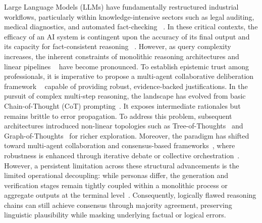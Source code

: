 \documentclass{article}
\begin{document}
Large Language Models (LLMs) have fundamentally restructured industrial workflows, particularly within knowledge-intensive sectors such as legal auditing, medical diagnostics, and automated fact-checking ~\citep{openai2023gpt4, deepseek2024v3}. In these critical contexts, the efficacy of an AI system is contingent upon the accuracy of its final output and its capacity for fact-consistent reasoning ~\citep{ji2023survey, huang2025survey}. However, as query complexity increases, the inherent constraints of monolithic reasoning architectures and linear pipelines ~\citep{wei2022chain, zhou2022least} have become pronounced. To establish epistemic trust among professionals, it is imperative to propose a multi-agent collaborative deliberation framework ~\citep{du2023improving, li2023camel} capable of providing robust, evidence-backed justifications. In the pursuit of complex multi-step reasoning, the landscape has evolved from basic Chain-of-Thought (CoT) prompting~\citep{wei2022chain, zhou2022least, wang2022self, wang2023plan}. It exposes intermediate rationales but remains brittle to error propagation. To address this problem, subsequent architectures introduced non-linear topologies such as Tree-of-Thoughts~\citep{yao2023tree} and Graph-of-Thoughts~\citep{besta2024graph, yue2023llmcascades} for richer exploration. Moreover, the paradigm has shifted toward multi-agent collaboration and consensus-based frameworks~\citep{du2023improving, li2023camel, chen2024reconcile, wang2024mixture, qian2024scaling, feng2024don}, where robustness is enhanced through iterative debate or collective orchestration~\cite{dang2025multi, liu2025breaking}. However, a persistent limitation across these structural advancements is the limited operational decoupling: while personas differ, the generation and verification stages remain tightly coupled within a monolithic process or aggregate outputs at the terminal level~\cite{wynn2025talk, li2025advancing}. Consequently, logically flawed reasoning chains can still achieve consensus through majority agreement, preserving linguistic plausibility while masking underlying factual or logical errors.
\end{document}
